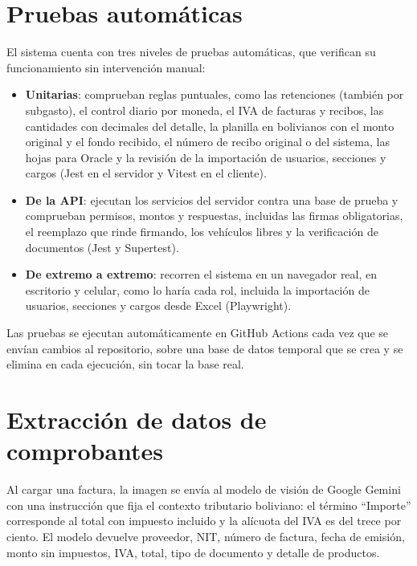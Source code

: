 \documentclass[11pt,letterpaper]{article}
\begin{document}
\section{Pruebas automáticas}
El sistema cuenta con tres niveles de pruebas automáticas, que verifican su funcionamiento sin intervención manual:
\begin{itemize}
  \item \textbf{Unitarias}: comprueban reglas puntuales, como las retenciones (también por subgasto), el control diario por moneda, el IVA de facturas y recibos, las cantidades con decimales del detalle, la planilla en bolivianos con el monto original y el fondo recibido, el número de recibo original o del sistema, las hojas para Oracle y la revisión de la importación de usuarios, secciones y cargos (Jest en el servidor y Vitest en el cliente).
  \item \textbf{De la API}: ejecutan los servicios del servidor contra una base de prueba y comprueban permisos, montos y respuestas, incluidas las firmas obligatorias, el reemplazo que rinde firmando, los vehículos libres y la verificación de documentos (Jest y Supertest).
  \item \textbf{De extremo a extremo}: recorren el sistema en un navegador real, en escritorio y celular, como lo haría cada rol, incluida la importación de usuarios, secciones y cargos desde Excel (Playwright).
\end{itemize}
Las pruebas se ejecutan automáticamente en GitHub Actions cada vez que se envían cambios al repositorio, sobre una base de datos temporal que se crea y se elimina en cada ejecución, sin tocar la base real.

\section{Extracción de datos de comprobantes}
Al cargar una factura, la imagen se envía al modelo de visión de Google Gemini con una instrucción que fija el contexto tributario boliviano: el término ``Importe'' corresponde al total con impuesto incluido y la alícuota del IVA es del trece por ciento. El modelo devuelve proveedor, NIT, número de factura, fecha de emisión, monto sin impuestos, IVA, total, tipo de documento y detalle de productos.
\end{document}
